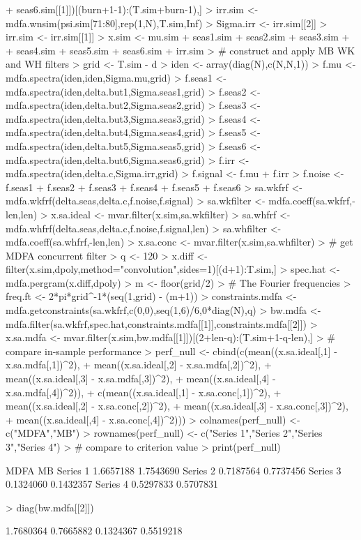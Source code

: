 \documentclass[a4paper]{book}
\begin{document}
\begin{Schunk}
\begin{Sinput}
+                      seas6.sim[[1]])[(burn+1-1):(T.sim+burn-1),]
> irr.sim <- mdfa.wnsim(psi.sim[71:80],rep(1,N),T.sim,Inf)
> Sigma.irr <- irr.sim[[2]]
> irr.sim <- irr.sim[[1]] 
> x.sim <- mu.sim + seas1.sim + seas2.sim + seas3.sim +
+   seas4.sim + seas5.sim + seas6.sim + irr.sim
> # construct and apply MB WK and WH filters
> grid <- T.sim - d
> iden <- array(diag(N),c(N,N,1))
> f.mu <- mdfa.spectra(iden,iden,Sigma.mu,grid)
> f.seas1 <- mdfa.spectra(iden,delta.but1,Sigma.seas1,grid)
> f.seas2 <- mdfa.spectra(iden,delta.but2,Sigma.seas2,grid)
> f.seas3 <- mdfa.spectra(iden,delta.but3,Sigma.seas3,grid)
> f.seas4 <- mdfa.spectra(iden,delta.but4,Sigma.seas4,grid)
> f.seas5 <- mdfa.spectra(iden,delta.but5,Sigma.seas5,grid)
> f.seas6 <- mdfa.spectra(iden,delta.but6,Sigma.seas6,grid)
> f.irr <- mdfa.spectra(iden,delta.c,Sigma.irr,grid)
> f.signal <- f.mu + f.irr
> f.noise <- f.seas1 + f.seas2 + f.seas3 + f.seas4 + f.seas5 + f.seas6
> sa.wkfrf <- mdfa.wkfrf(delta.seas,delta.c,f.noise,f.signal)
> sa.wkfilter <- mdfa.coeff(sa.wkfrf,-len,len)
> x.sa.ideal <- mvar.filter(x.sim,sa.wkfilter)
> sa.whfrf <- mdfa.whfrf(delta.seas,delta.c,f.noise,f.signal,len)
> sa.whfilter <- mdfa.coeff(sa.whfrf,-len,len)
> x.sa.conc <- mvar.filter(x.sim,sa.whfilter)
> # get MDFA concurrent filter
> q <- 120
> x.diff <- filter(x.sim,dpoly,method="convolution",sides=1)[(d+1):T.sim,]
> spec.hat <- mdfa.pergram(x.diff,dpoly)
> m <- floor(grid/2)
> # The Fourier frequencies
> freq.ft <- 2*pi*grid^{-1}*(seq(1,grid) - (m+1))
> constraints.mdfa <- mdfa.getconstraints(sa.wkfrf,c(0,0),seq(1,6)/6,0*diag(N),q)
> bw.mdfa <- mdfa.filter(sa.wkfrf,spec.hat,constraints.mdfa[[1]],constraints.mdfa[[2]])
> x.sa.mdfa <- mvar.filter(x.sim,bw.mdfa[[1]])[(2+len-q):(T.sim+1-q-len),]
> # compare in-sample performance
> perf_null <- cbind(c(mean((x.sa.ideal[,1] - x.sa.mdfa[,1])^2),
+ 	mean((x.sa.ideal[,2] - x.sa.mdfa[,2])^2),
+ 	mean((x.sa.ideal[,3] - x.sa.mdfa[,3])^2),
+ 	mean((x.sa.ideal[,4] - x.sa.mdfa[,4])^2)),
+   c(mean((x.sa.ideal[,1] - x.sa.conc[,1])^2),
+ 	mean((x.sa.ideal[,2] - x.sa.conc[,2])^2),
+ 	mean((x.sa.ideal[,3] - x.sa.conc[,3])^2),
+ 	mean((x.sa.ideal[,4] - x.sa.conc[,4])^2)))
> colnames(perf_null) <- c("MDFA","MB")
> rownames(perf_null) <- c("Series 1","Series 2","Series 3","Series 4")
> # compare to criterion value
> print(perf_null)
\end{Sinput}
\begin{Soutput}
              MDFA        MB
Series 1 1.6657188 1.7543690
Series 2 0.7187564 0.7737456
Series 3 0.1324060 0.1432357
Series 4 0.5297833 0.5707831
\end{Soutput}
\begin{Sinput}
> diag(bw.mdfa[[2]])
\end{Sinput}
\begin{Soutput}
[1] 1.7680364 0.7665882 0.1324367 0.5519218
\end{Soutput}
\end{Schunk}
\end{document}
